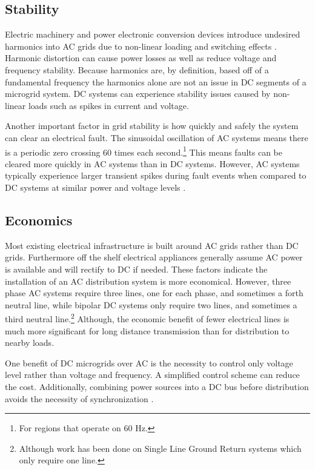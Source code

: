\subsection{Stability}
Electric machinery and power electronic conversion devices introduce undesired harmonics into AC grids due to non-linear loading and switching effects \cite{Grotzbach1997}. Harmonic distortion can cause power losses as well as reduce voltage and frequency stability. Because harmonics are, by definition, based off of a fundamental frequency the harmonics alone are not an issue in DC segments of a microgrid system. DC systems can experience stability issues caused by non-linear loads such as spikes in current and voltage.

Another important factor in grid stability is how quickly and safely the system can clear an electrical fault. The sinusoidal oscillation of AC systems means there is a periodic zero crossing 60 times each second.\footnote{For regions that operate on 60 Hz.} This means faults can be cleared more quickly in AC systems than in DC systems.  However, AC systems typically experience larger transient spikes during fault events when compared to DC systems at similar power and voltage levels \cite{Estes2011}. 

\subsection{Economics}
Most existing electrical infrastructure is built around AC grids rather than DC grids. Furthermore off the shelf electrical appliances generally assume AC power is available and will rectify to DC if needed. These factors indicate the installation of an AC distribution system is more economical. However, three phase AC systems require three lines, one for each phase, and sometimes a forth neutral line, while bipolar DC systems only require two lines, and sometimes a third neutral line.\footnote{Although work has been done on Single Line Ground Return systems which only require one line.} Although, the economic benefit of fewer electrical lines is much more significant for long distance transmission than for distribution to nearby loads.

One benefit of DC microgrids over AC is the necessity to control only voltage level rather than voltage and frequency. A simplified control scheme can reduce the cost. Additionally, combining power sources into a DC bus before distribution avoids the necessity of synchronization \cite{Lotfi2015}.

